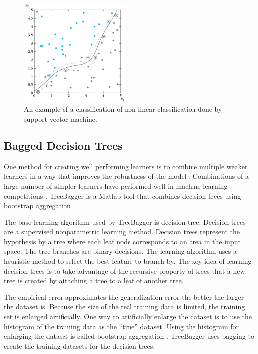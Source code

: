 \begin{figure}[H]
\centering
\includegraphics[width=0.48\textwidth]{images/support-vector-machine-non-linear.pdf}
\caption{An example of a classification of non-linear classification done by support vector machine.~\cite{theodoridis:2009:pattern-recognition}}
\label{fig:support-vector-machine-linear-non-linear}
\end{figure}

\subsection{Bagged Decision Trees}
One method for creating well performing learners is to combine multiple weaker learners in a way that improves the robustness of the model \cite{alpaydin:2004:introduction}. Combinations of a large number of simpler learners have performed well in machine learning competitions \cite{kaggle:2015:winner}. TreeBagger is a Matlab tool that combines decision trees using bootstrap aggregation \cite{matlab:2015:treebagger}.

The base learning algorithm used by TreeBagger is decision tree. Decision trees are a supervised nonparametric learning method. Decision trees represent the hypothesis by a tree where each leaf node corresponds to an area in the input space. The tree branches are binary decisions. The learning algorithm uses a heuristic method to select the best feature to branch by. The key idea of learning decision trees is to take advantage of the recursive property of trees that a new tree is created by attaching a tree to a leaf of another tree. \cite{alpaydin:2004:introduction}

The empirical error approximates the generalization error the better the larger the dataset is. Because the size of the real training data is limited, the training set is enlarged artificially. One way to artificially enlarge the dataset is to use the histogram of the training data as the ``true'' dataset. Using the histogram for enlarging the dataset is called bootstrap aggregation \cite{breiman:1996:bagging}. TreeBagger uses bagging to create the training datasets for the decision trees.

